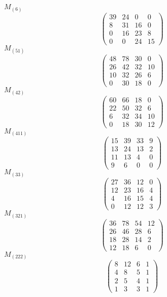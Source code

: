 \documentclass[12pt,reqno]{amsart}
\begin{document}
\Large
$M_{(6)}$                             $$ \begin{pmatrix} 
                          39 & 24 & 0 & 0 \\[6pt]
                          8 & 31 & 16 & 0 \\[6pt]
                          0 & 16 & 23 & 8 \\[6pt]
                            0 & 0 & 24 & 15
                              \end{pmatrix} $$ 
$M_{(51)}$                             $$ \begin{pmatrix} 
                         48 & 78 & 30 & 0 \\[6pt]
                         26 & 42 & 32 & 10 \\[6pt]
                         10 & 32 & 26 & 6 \\[6pt]
                            0 & 30 & 18 & 0
                              \end{pmatrix} $$ 
$M_{(42)}$                             $$ \begin{pmatrix} 
                         60 & 66 & 18 & 0 \\[6pt]
                         22 & 50 & 32 & 6 \\[6pt]
                         6 & 32 & 34 & 10 \\[6pt]
                           0 & 18 & 30 & 12
                              \end{pmatrix} $$ 
$M_{(411)}$                             $$ \begin{pmatrix} 
                         15 & 39 & 33 & 9 \\[6pt]
                         13 & 24 & 13 & 2 \\[6pt]
                          11 & 13 & 4 & 0 \\[6pt]
                             9 & 6 & 0 & 0
                              \end{pmatrix} $$ 
$M_{(33)}$                             $$ \begin{pmatrix} 
                         27 & 36 & 12 & 0 \\[6pt]
                         12 & 23 & 16 & 4 \\[6pt]
                          4 & 16 & 15 & 4 \\[6pt]
                            0 & 12 & 12 & 3
                              \end{pmatrix} $$ 
$M_{(321)}$                             $$ \begin{pmatrix} 
                         36 & 78 & 54 & 12 \\[6pt]
                         26 & 46 & 28 & 6 \\[6pt]
                         18 & 28 & 14 & 2 \\[6pt]
                            12 & 18 & 6 & 0
                              \end{pmatrix} $$ 
$M_{(222)}$                             $$ \begin{pmatrix} 
                          8 & 12 & 6 & 1 \\[6pt]
                           4 & 8 & 5 & 1 \\[6pt]
                           2 & 5 & 4 & 1 \\[6pt]
                             1 & 3 & 3 & 1
                              \end{pmatrix} $$ 
\end{document}
